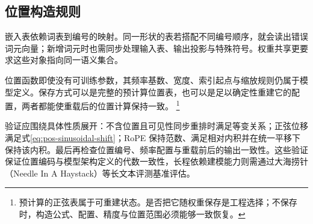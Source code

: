 \documentclass[../textbook.tex]{subfiles}
\begin{document}
\subsection{位置构造规则}
嵌入表依赖词表到编号的映射。同一形状的表若搭配不同编号顺序，就会读出错误词元向量；新增词元时也需同步处理输入表、输出投影与特殊符号。权重共享更要求这些对象指向同一语义集合。

位置函数即使没有可训练参数，其频率基数、宽度、索引起点与缩放规则仍属于模型定义。保存方式可以是完整的预计算位置表，也可以是足以确定性重建它的配置，两者都能使重载后的位置计算保持一致。
\footnote{预计算的正弦表属于可重建状态。是否把它随权重保存是工程选择；不保存时，构造公式、配置、精度与位置范围必须能够一致恢复。}

验证应围绕具体性质展开：不含位置且可见性同步重排时满足等变关系；正弦位移满足式\eqref{eq:pos-sinusoidal-shift}；RoPE 保持范数、满足相对内积并在统一平移下保持该内积。最后再检查位置编号、频率配置与重载前后的输出一致性。这些验证保证位置编码与模型架构定义的代数一致性，长程依赖建模能力则需通过大海捞针（Needle In A Haystack）等长文本评测基准评估。

\chapterreferences
\myendchapterdocument
\end{document}
